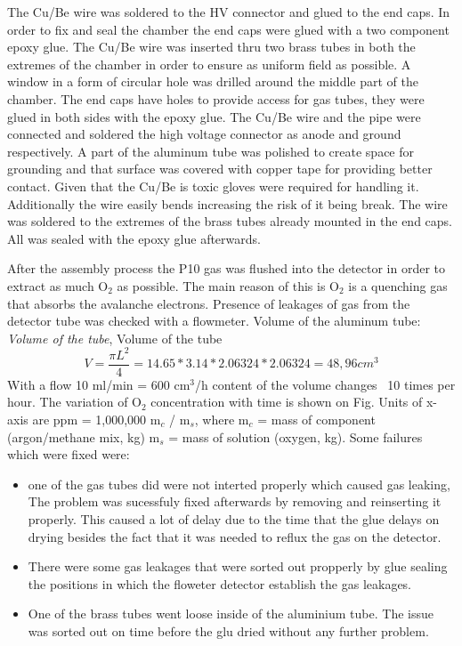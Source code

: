 The Cu/Be wire was soldered to the HV connector and glued to the end caps. In
order to fix and seal the chamber the end caps were glued with a two component
epoxy glue.  The Cu/Be wire was inserted thru two brass tubes in both the
extremes of the chamber in order to ensure as uniform field as possible.  A
window in a form of circular hole was drilled around the middle part of the
chamber. The end caps have holes to provide access for gas tubes, they were
glued in both sides with the epoxy glue.  The Cu/Be wire and the pipe were
connected and soldered the high voltage connector as anode and ground
respectively. A part of the aluminum tube was polished to create space for
grounding and that surface was covered with copper tape for providing better
contact.  Given that the Cu/Be is toxic gloves were required for handling it.
Additionally the wire easily bends increasing the risk of it being break. The
wire was soldered to the extremes of the brass tubes already mounted in the end
caps. All was sealed with the epoxy glue afterwards.

After the assembly process the P10 gas was flushed into the detector in order to
extract as much O$_2$ as possible. The main reason of this is O$_2$ is a
quenching gas that absorbs the avalanche electrons.  Presence of leakages of gas
from the detector tube was checked with a flowmeter. Volume of the aluminum
tube: \emph{Volume of the tube}, Volume of the tube
\begin{equation}
  \label{eq:tube_volume}
  V=\frac{\pi L^2}{4} =14.65*3.14*2.06324*2.06324=48,96 cm^3
\end{equation}
With a flow 10 ml/min = 600 cm$^3$/h content of the volume changes ~10 times per
hour. The variation of O$_{2}$ concentration with time is shown on Fig.  Units
of x-axis are ppm = 1,000,000 m$_{c}$ / m$_{s}$, where m$_{c}$ = mass of
component (argon/methane mix, kg) m$_{s}$ = mass of solution (oxygen, kg).  Some
failures which were fixed were:
\begin{itemize}
\item one of the gas tubes did were not interted properly which caused gas
  leaking, The problem was sucessfuly fixed afterwards by removing and
  reinserting it properly.  This caused a lot of delay due to the time that the
  glue delays on drying besides the fact that it was needed to reflux the gas on
  the detector.
\item There were some gas leakages that were sorted out propperly by glue
  sealing the positions in which the floweter detector establish the gas
  leakages.
\item One of the brass tubes went loose inside of the aluminium tube. The issue
  was sorted out on time before the glu dried without any further problem.
\end{itemize}

